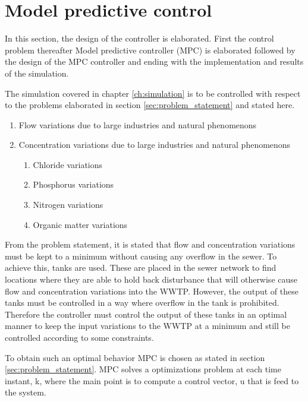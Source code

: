 \section{Model predictive control}\label{se:model_predictive_control}
In this section, the design of the controller is elaborated. First the control problem thereafter Model predictive controller (MPC) is elaborated followed by the design of the MPC controller and ending with the implementation and results of the simulation. 

The simulation covered in chapter \ref{ch:simulation} is to be controlled with respect to the problems elaborated in section \ref{sec:problem_statement} and stated here. 
\begin{enumerate}
\item Flow variations due to large industries and natural phenomenons
\item Concentration variations due to large industries and natural phenomenons
\begin{enumerate}
	\item Chloride variations
	\item Phosphorus variations
	\item Nitrogen variations
	\item Organic matter variations
\end{enumerate}
\end{enumerate}

From the problem statement, it is stated that flow and concentration variations must be kept to a minimum without causing any overflow in the sewer. To achieve this, tanks are used. These are placed in the sewer network to find locations where they are able to hold back disturbance that will otherwise cause flow and concentration variations into the WWTP. However, the output of these tanks must be controlled in a way where overflow in the tank is prohibited. Therefore the controller must control the output of these tanks in an optimal manner to keep the input variations to the WWTP at a minimum and still be controlled according to some constraints.

To obtain such an optimal behavior MPC is chosen as stated in section \ref{sec:problem_statement}. MPC solves a optimizations problem at each time instant, k, where the main point is to compute a control vector, u that is feed to the system. 

